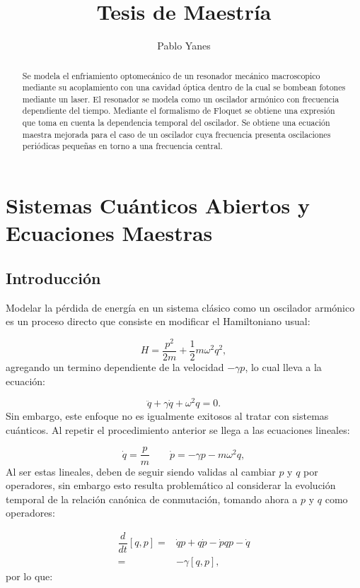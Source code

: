 \documentclass[a4paper,10pt]{report}
\title{Tesis de Maestría}
\author{Pablo Yanes}
\begin{document}
\begin{abstract}
Se modela el enfriamiento optomecánico de un resonador mecánico macroscopico mediante su acoplamiento con una cavidad óptica dentro de la cual se bombean fotones mediante un laser. El resonador se modela como un oscilador armónico con frecuencia dependiente del tiempo. Mediante el formalismo de Floquet se obtiene una expresión que toma en cuenta la dependencia temporal del oscilador. Se obtiene una ecuación maestra mejorada para el caso de un oscilador cuya frecuencia presenta oscilaciones periódicas pequeñas en torno a una frecuencia central. 
\end{abstract}

\tableofcontents


\chapter{Sistemas Cuánticos Abiertos y Ecuaciones Maestras}

\section{Introducción}

Modelar la pérdida de energía en un sistema clásico como un oscilador armónico es un proceso directo \cite{CarmichaelQO} que consiste en modificar el Hamiltoniano usual:

\begin{equation}
H = \frac{p^2}{2m} + \frac{1}{2} m\omega^2 q^2,
\end{equation} agregando un termino dependiente de la velocidad $-\gamma p$, lo cual lleva a la ecuación:

\begin{equation}
\ddot{q} + \gamma \dot{q} + \omega^2 q = 0.
\end{equation} Sin embargo, este enfoque no es igualmente exitosos al tratar con sistemas cuánticos. Al repetir el procedimiento anterior se llega a las ecuaciones lineales:

\begin{equation}
\dot{q} = \frac{p}{m} \qquad \dot{p} = -\gamma p -m\omega ^2 q,
\end{equation}Al ser estas lineales, deben de seguir siendo validas al cambiar $p$ y $q$ por operadores, sin embargo esto resulta problemático al considerar la evolución temporal de la relación canónica de conmutación, tomando ahora a $p$ y $q$ como operadores:

\begin{align*}
 \dfrac{d}{dt}[q,p] =& \dot{q}p + q\dot{p} - \dot{p}q p-\dot{q}\\  
 =& -\gamma[q,p],
\end{align*}por lo que:
\end{document}
